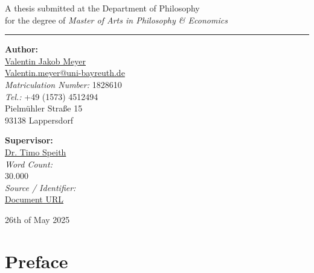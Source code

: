 \documentclass[
  11pt,
  letterpaper,
]{book}
\renewcommand*\contentsname{Table of contents}
\newcommand\contentsname{Table of contents}
\begin{document}
\begin{titlepage}
\begin{center}
  A thesis submitted at the Department of Philosophy\\[0.4cm]
  for the degree of \textit{Master of Arts in Philosophy \& Economics}
\end{center}

\vspace{1.5cm}
\hrule
\vspace{1.5cm}

\begin{minipage}[t]{0.48\textwidth}
  \textbf{Author:}\\[0.3cm]
  \href{https://www.vjmeyer.org}{Valentin Jakob Meyer}\\
  \href{mailto:Valentin.meyer@uni-bayreuth.de}{Valentin.meyer@uni-bayreuth.de}\\
  \textit{Matriculation Number:} 1828610\\
  \textit{Tel.:} +49 (1573) 4512494\\
  Pielmühler Straße 15\\
  93138 Lappersdorf
\end{minipage}
\hfill
\begin{minipage}[t]{0.48\textwidth}
  \begin{flushright}
    \textbf{Supervisor:}\\[0.3cm]
    \href{mailto:timo.speith@uni-bayreuth.de}{Dr. Timo Speith}\\[0.35cm]
    \textit{Word Count:}\\
    30.000\\[0.1cm]
    \textit{Source / Identifier:}\\
    \href{https://github.com/VJMeyer/submission}{Document URL}
  \end{flushright}
\end{minipage}

\vfill
\begin{center}
  26th of May 2025
\end{center}
\end{titlepage}

\cleardoublepage

\renewcommand*\contentsname{Table of Contents}
{
\setcounter{tocdepth}{9}
\tableofcontents
}
\listoffigures
\listoftables

\mainmatter
{}

\chapter*{Preface}\label{preface}
\end{document}
